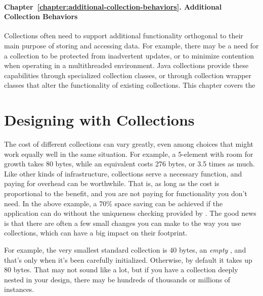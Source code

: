 \paragraph{Chapter~\ref{chapter:additional-collection-behaviors}. Additional
Collection Behaviors} Collections often need to support additional functionality
orthogonal to their main purpose of storing and accessing data.  For example,
there may be a need for a collection to be protected from inadvertent
updates, or to minimize contention when operating in a
multithreaded environment.  Java collections provide these capabilities through
specialized collection classes, or through collection wrapper classes that alter
the functionality of existing collections.  This chapter covers the 

\section{Designing with Collections}
\label{sec:designing-with-collections}
The cost of different collections can vary greatly, even among choices that
might work equally well in the same situation. For example, a 5-element 
with room for growth takes 80 bytes, while an equivalent  costs 276 bytes, or 3.5 times as much. 
Like other kinds of infrastructure, collections serve a necessary
function, and paying for overhead can be worthwhile.  That is, as long as
the cost is proportional to the benefit, and you are not paying
for functionality you don't need. In the above example, a 70\% space saving
can be achieved if the application can do without the uniqueness checking
provided by .  The good news is that there are often a few small
changes you can make to the way you use collections, which can have a big
impact on their footprint.

For example,
the very smallest standard collection is 40 bytes, an \emph{empty}
, and that's only when it's been carefully initialized. 
Otherwise, by default it takes up 80 bytes. That may not sound like a lot,
but if you have a collection deeply nested in your design, there may be
hundreds of thousands or millions of instances.



